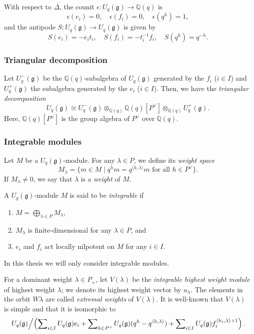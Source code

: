 \documentclass[final]{amsart}
\theoremstyle{plain}
\theoremstyle{definition}
\newcommand{\bbQ}{\mathbb Q}
\newcommand{\frakg}{\mathfrak g}
\begin{document}
With respect to $\Delta$, the counit $\epsilon\colon U_q(\frakg) \to \bbQ(q)$ is
\begin{equation}
    \epsilon(e_i) = 0,\quad \epsilon(f_i) = 0,\quad \epsilon(q^h) = 1,
\end{equation}
and the antipode $S\colon U_q(\frakg) \to U_q(\frakg)$ is given by
\begin{equation}
    S(e_i) = -e_i t_i,\quad S(f_i) = -t_i^{-1} f_i,\quad S(q^h) = q^{-h}.
\end{equation}

\subsubsection*{Triangular decomposition}
\label{section:triangular-decomposition}

Let $U_q^-(\frakg)$ be the $\bbQ(q)$-subalgebra of $U_q(\frakg)$ generated by the $f_i$ ($i\in I$) and $U_q^+(\frakg)$ the subalgebra generated by the $e_i$ ($i\in I$).
Then, we have the \emph{triangular decomposition} \cite{Lusztig:IntroductionToQuantumGroups}
\[
    U_q(\frakg) \cong U_q^-(\frakg) \otimes_{\bbQ(q)} \bbQ(q)[P^\vee] \otimes_{\bbQ(q)} U_q^+(\frakg).
\]
Here, $\bbQ(q)[P^\vee]$ is the group algebra of $P^\vee$ over $\bbQ(q)$.

\subsubsection*{Integrable modules}
\label{section:integrable-modules}

Let $M$ be a $U_q(\frakg)$-module. For any $\lambda \in P$, we define its \emph{weight space}
\[
    M_\lambda = \{ m \in M \mid q^h m = q^{\langle h, \lambda\rangle} m \text{ for all } h \in P^\vee \}.
\]
If $M_\lambda \neq 0$, we say that $\lambda$ is a \emph{weight} of $M$.

A $U_q(\frakg)$-module $M$ is said to be \emph{integrable} if
\begin{enumerate}
    \item $M = \bigoplus_{\lambda \in P} M_\lambda$,
    \item $M_\lambda$ is finite-dimensional for any $\lambda \in P$, and
    \item $e_i$ and $f_i$ act locally nilpotent on $M$ for any $i \in I$.
\end{enumerate}
In this thesis we will only consider integrable modules.

For a dominant weight $\lambda \in P_+$, let $V(\lambda)$ be the \emph{integrable highest weight module} of highest weight $\lambda$; we denote its highest weight vector by $u_\lambda$.
The elements in the orbit $W\lambda$ are called \emph{extremal weights} of $V(\lambda)$.
It is well-known \cite{Lusztig:IntroductionToQuantumGroups} that $V(\lambda)$ is simple and that it is isomorphic to
\[
    \left. U_q(\frakg) \middle/ \middle(\sum\nolimits_{i\in I} U_q(\frakg)e_i + \sum\nolimits_{h \in P^\vee} U_q(\frakg)(q^h - q^{\langle h, \lambda\rangle}) + \sum\nolimits_{i\in I} U_q(\frakg)f_i^{\langle h_i, \lambda\rangle + 1} \right).
\]
\end{document}

